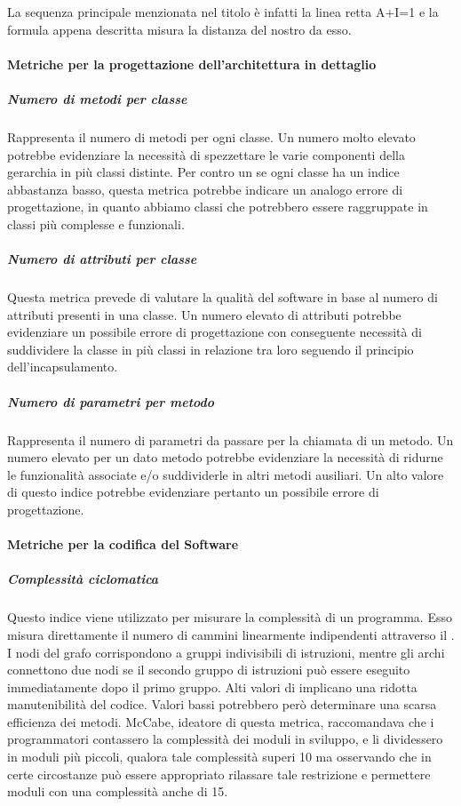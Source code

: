 La sequenza principale menzionata nel titolo è infatti la linea retta A+I=1 e la formula appena descritta misura la distanza del nostro  da esso.

\paragraph{Metriche per la progettazione dell'architettura in dettaglio}

\subparagraph{Numero di metodi per classe}
Rappresenta il numero di metodi per ogni classe.
Un numero molto elevato potrebbe evidenziare la necessità di spezzettare le varie componenti della gerarchia in più classi distinte.
Per contro un se ogni classe ha un indice abbastanza basso, questa metrica potrebbe indicare un analogo errore di progettazione, in quanto abbiamo classi che potrebbero essere raggruppate in classi più complesse e funzionali.

\subparagraph{Numero di attributi per classe}
Questa metrica prevede di valutare la qualità del software in base al numero di attributi presenti in una classe.
Un numero elevato di attributi potrebbe evidenziare un possibile errore di progettazione con conseguente necessità di suddividere la classe in più classi in relazione tra loro seguendo il principio dell'incapsulamento.

\subparagraph{Numero di parametri per metodo}
Rappresenta il numero di parametri da passare per la chiamata di un metodo.
Un numero elevato per un dato metodo potrebbe evidenziare la necessità di ridurne le funzionalità associate e/o suddividerle in altri metodi ausiliari.
Un alto valore di questo indice potrebbe evidenziare pertanto un possibile errore di progettazione.

\paragraph{Metriche per la codifica del Software}

\subparagraph{Complessità ciclomatica}
Questo indice viene utilizzato per misurare la complessità di un programma. Esso misura direttamente il numero di cammini linearmente indipendenti attraverso il . I nodi del grafo corrispondono a gruppi indivisibili di istruzioni, mentre gli archi connettono due nodi se il secondo gruppo di istruzioni può essere eseguito immediatamente dopo il primo gruppo.
Alti valori di  implicano una ridotta manutenibilità del codice. Valori bassi potrebbero però determinare  una scarsa efficienza dei metodi. McCabe, ideatore di questa metrica, raccomandava che i programmatori contassero la complessità dei moduli in sviluppo, e li dividessero in moduli più piccoli, qualora tale complessità superi 10 ma osservando che in certe circostanze può essere appropriato rilassare tale restrizione e permettere moduli con una complessità anche di 15.

